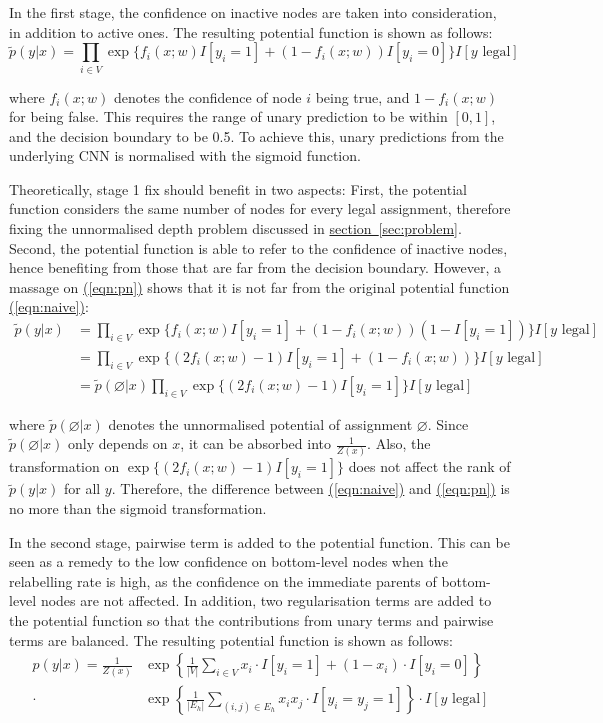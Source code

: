 \documentclass[11pt,a4paper]{article}
\begin{document}
In the first stage, the confidence on inactive nodes are taken into consideration, in addition to active ones. The resulting potential function is shown as follows:
\begin{equation}
\tilde{p}(y|x)=\prod_{i\in V}\exp\{f_i(x;w)I[y_i=1]+(1-f_i(x;w))I[y_i=0]\}I[y\text{ legal}]
\label{eqn:pn}
\end{equation}

where $f_i(x;w)$ denotes the confidence of node $i$ being true, and $1-f_i(x;w)$ for being false. This requires the range of unary prediction to be within $[0,1]$, and the decision boundary to be 0.5. To achieve this, unary predictions from the underlying CNN is normalised with the sigmoid function.

Theoretically, stage 1 fix should benefit in two aspects: First, the potential function considers the same number of nodes for every legal assignment, therefore fixing the unnormalised depth problem discussed in \hyperref[sec:problem]{section~\ref{sec:problem}}. Second, the potential function is able to refer to the confidence of inactive nodes, hence benefiting from those that are far from the decision boundary. However, a massage on \hyperref[eqn:pn]{(\ref{eqn:pn})} shows that it is not far from the original potential function \hyperref[eqn:naive]{(\ref{eqn:naive})}:
\begin{align}
\tilde{p}(y|x)&=\prod_{i\in V}\exp\{f_i(x;w)I[y_i=1]+(1-f_i(x;w))(1-I[y_i=1])\}I[y\text{ legal}]\nonumber\\
&=\prod_{i\in V}\exp\{(2f_i(x;w)-1)I[y_i=1]+(1-f_i(x;w))\}I[y\text{ legal}]\nonumber\\
&=\tilde{p}(\varnothing|x)\prod_{i\in V}\exp\{(2f_i(x;w)-1)I[y_i=1]\}I[y\text{ legal}]
\end{align}

where $\tilde{p}(\varnothing|x)$ denotes the unnormalised potential of assignment $\varnothing$. Since $\tilde{p}(\varnothing|x)$ only depends on $x$, it can be absorbed into $\frac{1}{Z(x)}$. Also, the transformation on $\exp\{(2f_i(x;w)-1)I[y_i=1]\}$ does not affect the rank of $\tilde{p}(y|x)$ for all $y$. Therefore, the difference between \hyperref[eqn:naive]{(\ref{eqn:naive})} and \hyperref[eqn:pn]{(\ref{eqn:pn})} is no more than the sigmoid transformation.

In the second stage, pairwise term is added to the potential function. This can be seen as a remedy to the low confidence on bottom-level nodes when the relabelling rate is high, as the confidence on the immediate parents of bottom-level nodes are not affected. In addition, two regularisation terms are added to the potential function so that the contributions from unary terms and pairwise terms are balanced. The resulting potential function is shown as follows:
\begin{align}
p(y|x)=\frac{1}{Z(x)}&\exp\left\{\frac{1}{|V|}\sum_{i\in V}x_i\cdot I[y_i=1]+(1-x_i)\cdot I[y_i=0]\right\}\nonumber\\
\cdot&\exp\left\{\frac{1}{|E_h|}\sum_{(i,j)\in E_h}x_ix_j\cdot I[y_i=y_j=1]\right\}\cdot I[y\text{ legal}]
\end{align}
\end{document}
